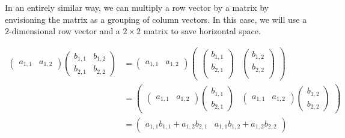 \documentclass{ximera}
\begin{document}
In an entirely similar way, we can multiply a row vector by a matrix
by envisioning the matrix as a grouping of column vectors. In this
case, we will use a $2$-dimensional row vector and a $2\times2$ matrix
to save horizontal space.

\begin{align*}
\begin{pmatrix} a_{1,1} & a_{1,2}  \end{pmatrix}
\begin{pmatrix}
  b_{1,1} & b_{1,2} \\
  b_{2,1} & b_{2,2}
\end{pmatrix}
&=
\begin{pmatrix} a_{1,1} & a_{1,2}  \end{pmatrix}%
\begin{pmatrix}
  \begin{pmatrix} b_{1,1} \\ b_{2,1} \\  \end{pmatrix} &
  \begin{pmatrix} b_{1,2} \\ b_{2,2} \\ \end{pmatrix}
\end{pmatrix} \\
&=
\begin{pmatrix}
  \begin{pmatrix} a_{1,1} & a_{1,2} \end{pmatrix}\begin{pmatrix} b_{1,1} \\ b_{2,1} \end{pmatrix} &
  \begin{pmatrix} a_{1,1} & a_{1,2} \end{pmatrix}\begin{pmatrix} b_{1,2} \\ b_{2,2} \end{pmatrix}
\end{pmatrix}\\
&=
\begin{pmatrix}
a_{1,1}b_{1,1}+a_{1,2}b_{2,1} &
a_{1,1}b_{1,2}+a_{1,2}b_{2,2}
\end{pmatrix}
\end{align*}
\end{document}
